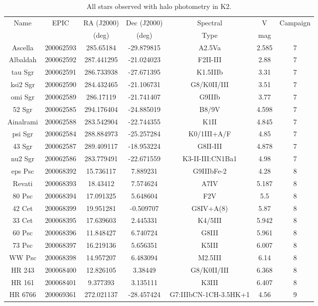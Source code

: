 \begin{table*}
\caption{All stars observed with halo photometry in K2.\label{table_all}}
\begin{tabular}{ccccccc}
\hline \hline
Name & EPIC & RA (J2000) & Dec (J2000) & Spectral & V & Campaign \\
 &  & (deg) & (deg) & Type & mag &  \\
\hline
Ascella & 200062593 & 285.65184 & -29.879815 & A2.5Va & 2.585 & 7 \\
Albaldah & 200062592 & 287.441295 & -21.024023 & F2II-III & 2.88 & 7 \\
tau Sgr & 200062591 & 286.733938 & -27.671395 & K1.5IIIb & 3.31 & 7 \\
ksi2 Sgr & 200062590 & 284.432465 & -21.106731 & G8/K0II/III & 3.51 & 7 \\
omi Sgr & 200062589 & 286.17119 & -21.741407 & G9IIIb & 3.77 & 7 \\
52 Sgr & 200062585 & 294.176404 & -24.885019 & B8/9V & 4.598 & 7 \\
Ainalrami & 200062588 & 283.542904 & -22.744355 & K1II & 4.845 & 7 \\
psi Sgr & 200062584 & 288.884973 & -25.257284 & K0/1III+A/F & 4.85 & 7 \\
43 Sgr & 200062587 & 289.409117 & -18.953224 & G8II-III & 4.878 & 7 \\
nu2 Sgr & 200062586 & 283.779491 & -22.671559 & K3-II-III:CN1Ba1 & 4.98 & 7 \\
eps Psc & 200068392 & 15.736117 & 7.889231 & G9IIIbFe-2 & 4.28 & 8 \\
Revati & 200068393 & 18.43412 & 7.574624 & A7IV & 5.187 & 8 \\
80 Psc & 200068394 & 17.091325 & 5.648604 & F2V & 5.5 & 8 \\
42 Cet & 200068399 & 19.951281 & -0.509707 & G8IV+A(8) & 5.87 & 8 \\
33 Cet & 200068395 & 17.639603 & 2.445331 & K4/5III & 5.942 & 8 \\
60 Psc & 200068396 & 11.848427 & 6.740724 & G8III & 5.961 & 8 \\
73 Psc & 200068397 & 16.219136 & 5.656351 & K5III & 6.007 & 8 \\
WW Psc & 200068398 & 14.957207 & 6.483094 & M2.5III & 6.14 & 8 \\
HR 243 & 200068400 & 12.826105 & 3.38449 & G8/K0II/III & 6.368 & 8 \\
HR 161 & 200068401 & 9.377393 & 3.135111 & K3III & 6.407 & 8 \\
HR 6766 & 200069361 & 272.021137 & -28.457424 & G7:IIIbCN-1CH-3.5HK+1 & 4.56 & 9 \\

\end{tabular}
\end{table*}
